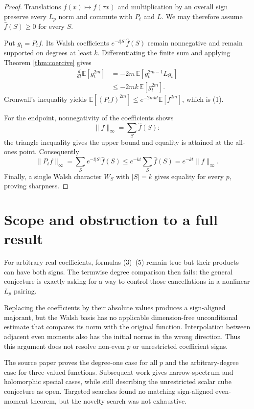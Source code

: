 \documentclass[11pt]{article}
\newcommand{\E}{\mathbb E}
\newcommand{\wh}{\widehat}
\begin{document}
\begin{proof}
Translations $f(x)\mapsto f(\tau x)$ and multiplication by an overall
sign preserve every $L_p$ norm and commute with $P_t$ and $L$.
We may therefore assume $\wh f(S)\ge0$ for every $S$.

Put $g_t=P_tf$.  Its Walsh coefficients
$e^{-t|S|}\wh f(S)$ remain nonnegative and remain supported on degrees
at least $k$.  Differentiating the finite sum and applying Theorem
\ref{thm:coercive} gives
\begin{align*}
 \frac{d}{dt}\E[g_t^{2m}]
 &=-2m\,\E[g_t^{2m-1}Lg_t]\\
 &\le-2mk\,\E[g_t^{2m}].
\end{align*}
Gronwall's inequality yields
$\E[(P_tf)^{2m}]\le e^{-2mkt}\E[f^{2m}]$, which is (1).

For the endpoint, nonnegativity of the coefficients shows
\[
 \|f\|_\infty=\sum_S\wh f(S):
\]
the triangle inequality gives the upper bound and equality is attained
at the all-ones point.  Consequently
\[
 \|P_tf\|_\infty
 =\sum_Se^{-t|S|}\wh f(S)
 \le e^{-kt}\sum_S\wh f(S)
 =e^{-kt}\|f\|_\infty.
\]
Finally, a single Walsh character $W_S$ with $|S|=k$ gives equality for
every $p$, proving sharpness.
\end{proof}

\section{Scope and obstruction to a full result}

For arbitrary real coefficients, formulas (3)--(5) remain true but their
products can have both signs.  The termwise degree comparison then fails:
the general conjecture is exactly asking for a way to control those
cancellations in a nonlinear $L_p$ pairing.

Replacing the coefficients by their absolute values produces a
sign-aligned majorant, but the Walsh basis has no applicable
dimension-free unconditional estimate that compares its norm with the
original function.  Interpolation between adjacent even moments also has
the initial norms in the wrong direction.  Thus this argument does not
resolve non-even $p$ or unrestricted coefficient signs.

The source paper proves the degree-one case for all $p$ and the
arbitrary-degree case for three-valued functions.  Subsequent work gives
narrow-spectrum and holomorphic special cases, while still describing the
unrestricted scalar cube conjecture as open.  Targeted searches found no
matching sign-aligned even-moment theorem, but the novelty search was not
exhaustive.
\end{document}
